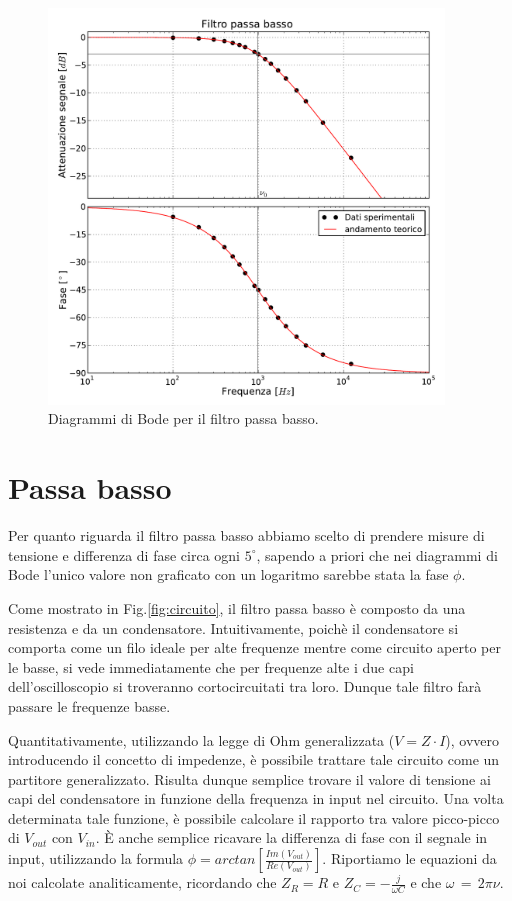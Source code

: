 \begin{figure}
    \includegraphics[width=105mm]{low.pdf}
    \caption{Diagrammi di Bode per il filtro passa basso.}
    \label{fig:low}
\end{figure}
\section{Passa basso}
Per quanto riguarda il filtro passa basso abbiamo scelto di prendere misure di tensione e differenza di fase circa ogni $5^{\circ}$, sapendo a priori che nei diagrammi di Bode l'unico valore non graficato con un logaritmo sarebbe stata la fase $\phi$.

Come mostrato in Fig.\ref{fig:circuito}, il filtro passa basso è composto da una resistenza e da un condensatore. Intuitivamente, poichè il condensatore si comporta come un filo ideale per alte frequenze mentre come circuito aperto per le basse, si vede immediatamente che per frequenze alte i due capi dell'oscilloscopio si troveranno cortocircuitati tra loro. Dunque tale filtro farà passare le frequenze basse.

Quantitativamente, utilizzando la legge di Ohm generalizzata ($V=Z \cdot I$), ovvero introducendo il concetto di impedenze, è possibile trattare tale circuito come un partitore generalizzato. Risulta dunque semplice trovare il valore di tensione ai capi del condensatore in funzione della frequenza in input nel circuito. Una volta determinata tale funzione, è possibile calcolare il rapporto tra valore picco-picco di $V_{out}$ con $V_{in}$. \`E anche semplice ricavare la differenza di fase con il segnale in input, utilizzando la formula $\phi=arctan[\frac{Im(V_{out})}{Re(V_{out})}]$. Riportiamo le equazioni da noi calcolate analiticamente, ricordando che $Z_R=R$ e $Z_C=-\frac{j}{\omega C}$ e che $\omega\,=\,2\pi\nu$.

